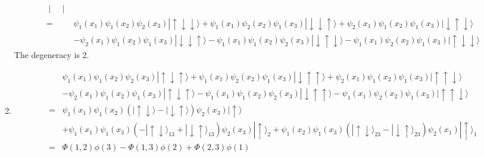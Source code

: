 \begin{enumerate}
\begin{align*}
\begin{vmatrix}
           \end{vmatrix}\\
           =&
    \psi_1(x_1)\psi_1(x_2)\psi_2(x_3)|\uparrow\downarrow\downarrow\rangle
    +
    \psi_1(x_1)\psi_2(x_2)\psi_1(x_3)|\downarrow\downarrow\uparrow\rangle+
    \psi_2(x_1)\psi_1(x_2)\psi_1(x_3)|\downarrow\uparrow\downarrow\rangle
    \\&-
    \psi_2(x_1)\psi_1(x_2)\psi_1(x_3)|\downarrow\downarrow\uparrow\rangle
    -
    \psi_1(x_1)\psi_1(x_2)\psi_2(x_3)|\downarrow\uparrow\downarrow\rangle-
    \psi_1(x_1)\psi_2(x_2)\psi_1(x_3)|\uparrow\downarrow\downarrow\rangle
       \end{align*}
       The degeneracy is 2.
       \item 
       \begin{align*}
           &\psi_1(x_1)\psi_1(x_2)\psi_2(x_3)|\uparrow\downarrow\uparrow\rangle
    +
    \psi_1(x_1)\psi_2(x_2)\psi_1(x_3)|\downarrow\uparrow\uparrow\rangle+
    \psi_2(x_1)\psi_1(x_2)\psi_1(x_3)|\uparrow\uparrow\downarrow\rangle
    \\&-
    \psi_2(x_1)\psi_1(x_2)\psi_1(x_3)|\uparrow\downarrow\uparrow\rangle
    -
    \psi_1(x_1)\psi_1(x_2)\psi_2(x_3)|\downarrow\uparrow\uparrow\rangle-
    \psi_1(x_1)\psi_2(x_2)\psi_1(x_3)|\uparrow\uparrow\downarrow\rangle\\
    =&\psi_1(x_1)\psi_1(x_2)
    (|\uparrow\downarrow\rangle -|\downarrow\uparrow\rangle)\psi_2(x_3)|\uparrow\rangle\\
    &
    +\psi_1(x_1)\psi_1(x_3)
    (-|\uparrow\downarrow\rangle_{13} +|\downarrow\uparrow\rangle_{13})\psi_2(x_3)|\uparrow\rangle_{2}
    +
    \psi_1(x_2)\psi_1(x_3)
    (|\uparrow\downarrow\rangle_{23} -|\downarrow\uparrow\rangle_{23})\psi_2(x_1)|\uparrow\rangle_{1}\\
    =&\Phi(1,2)\phi(3) -\Phi(1,3)\phi(2) + \Phi(2,3)\phi(1)
       \end{align*}
   \end{enumerate}
